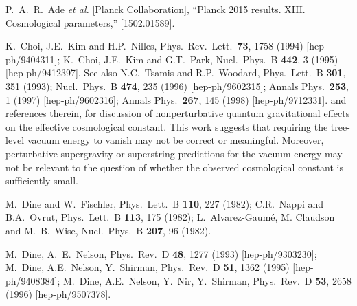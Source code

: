 \documentclass[12pt]{article}
\begin{document}
\begin{thebibliography}{999}
P.~A.~R.~Ade {\it et al.} [Planck Collaboration],
  ``Planck 2015 results. XIII. Cosmological parameters,''
  [1502.01589].
 
K.~Choi, J.E.~Kim and H.P.~Nilles, 
  Phys.\ Rev.\ Lett.\  {\bf 73}, 1758 (1994)
  [hep-ph/9404311];
K.~Choi, J.E.~Kim and G.T.~Park, 
  Nucl.\ Phys.\ B {\bf 442}, 3 (1995)
  [hep-ph/9412397].
See also
N.C.~Tsamis and R.P.~Woodard, 
  Phys.\ Lett.\ B {\bf 301}, 351 (1993);
  Nucl.\ Phys.\ B {\bf 474}, 235 (1996)
  [hep-ph/9602315];
  Annals Phys.\  {\bf 253}, 1 (1997)
  [hep-ph/9602316];
  Annals Phys.\  {\bf 267}, 145 (1998)
  [hep-ph/9712331].
and references therein, for discussion of nonperturbative quantum 
gravitational effects on the effective cosmological constant. This work 
suggests that requiring the tree-level vacuum energy to vanish may not be 
correct or meaningful. Moreover, perturbative supergravity or superstring 
predictions for the vacuum energy may not be relevant to the question of 
whether the observed cosmological constant is sufficiently small.

M.~Dine and W.~Fischler,
  Phys.\ Lett.\ B {\bf 110}, 227 (1982);
C.R.~Nappi and B.A.~Ovrut,
  Phys.\ Lett.\ B {\bf 113}, 175 (1982);
L.~Alvarez-Gaum\'e, M. Claudson and M.~B.~Wise, 
  Nucl.\ Phys.\ B {\bf 207}, 96 (1982).

M.~Dine, A.~E.~Nelson,
  Phys.\ Rev.\ D {\bf 48}, 1277 (1993)
  [hep-ph/9303230];
M.~Dine, A.E.~Nelson, Y.~Shirman, 
  Phys.\ Rev.\ D {\bf 51}, 1362 (1995)
  [hep-ph/9408384];
M.~Dine, A.E.~Nelson, Y.~Nir, Y.~Shirman, 
  Phys.\ Rev.\ D {\bf 53}, 2658 (1996)
  [hep-ph/9507378].


\end{thebibliography}
\end{document}
